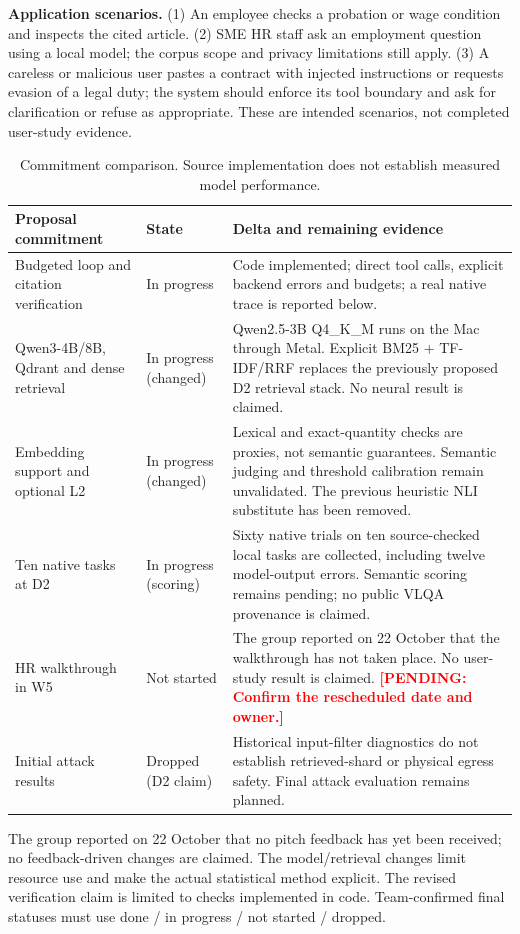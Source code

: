 \documentclass[a4paper,11pt]{article}
\newcommand{\hdr}[1]{\vspace{2pt}\noindent\textbf{#1}}
\newcommand{\pending}[1]{\textcolor{red}{\textbf{[PENDING: #1]}}}
\begin{document}
\hdr{Application scenarios.} (1) An employee checks a probation or wage condition and inspects the cited article. (2) SME HR staff ask an employment question using a local model; the corpus scope and privacy limitations still apply. (3) A careless or malicious user pastes a contract with injected instructions or requests evasion of a legal duty; the system should enforce its tool boundary and ask for clarification or refuse as appropriate. These are intended scenarios, not completed user-study evidence.

\begin{table}[H]\centering\footnotesize
\begin{tabularx}{\textwidth}{@{}L{3.1cm}L{2.0cm}X@{}}
\toprule Proposal commitment & State & Delta and remaining evidence\\\midrule
Budgeted loop and citation verification & In progress & Code implemented; direct tool calls, explicit backend errors and budgets; a real native trace is reported below.\\
Qwen3-4B/8B, Qdrant and dense retrieval & In progress (changed) & Qwen2.5-3B Q4\_K\_M runs on the Mac through Metal. Explicit BM25 + TF-IDF/RRF replaces the previously proposed D2 retrieval stack. No neural result is claimed.\\
Embedding support and optional L2 & In progress (changed) & Lexical and exact-quantity checks are proxies, not semantic guarantees. Semantic judging and threshold calibration remain unvalidated. The previous heuristic NLI substitute has been removed.\\
Ten native tasks at D2 & In progress (scoring) & Sixty native trials on ten source-checked local tasks are collected, including twelve model-output errors. Semantic scoring remains pending; no public VLQA provenance is claimed.\\
HR walkthrough in W5 & Not started & The group reported on 22 October that the walkthrough has not taken place. No user-study result is claimed. \pending{Confirm the rescheduled date and owner.}\\
Initial attack results & Dropped (D2 claim) & Historical input-filter diagnostics do not establish retrieved-shard or physical egress safety. Final attack evaluation remains planned.\\
\bottomrule\end{tabularx}
\caption{Commitment comparison. Source implementation does not establish measured model performance.}
\end{table}
The group reported on 22 October that no pitch feedback has yet been received; no feedback-driven changes are claimed.
The model/retrieval changes limit resource use and make the actual statistical method explicit. The revised verification claim is limited to checks implemented in code. Team-confirmed final statuses must use done / in progress / not started / dropped.
\end{document}
